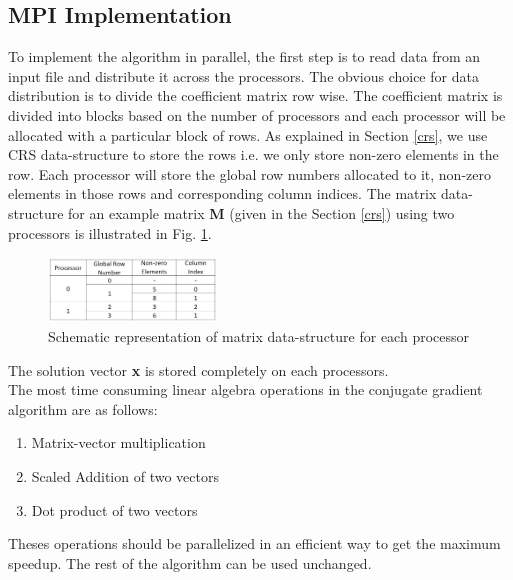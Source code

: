\documentclass[sigplan,screen]{acmart}
\begin{document}
\subsection{MPI Implementation}
To implement the algorithm in parallel, the first step is to read data from an input file and distribute it across the processors. The obvious choice for data distribution is to divide the  coefficient matrix row wise. The coefficient matrix is divided into blocks based on the number of processors and each processor will be allocated with a particular block of rows. As explained in Section \ref{crs}, we use CRS data-structure to store the rows i.e. we only store non-zero elements in the row. Each processor will store the global row numbers allocated to it, non-zero elements in those rows and corresponding column indices. The matrix data-structure for an example matrix \textbf{M} (given in the Section \ref{crs}) using two processors is illustrated in Fig. \ref{fig1}.
\begin{figure}[h!]
	\begin{center}
		\includegraphics[width=0.4\textwidth]{data.JPG}
	\end{center}
	\caption{Schematic representation of matrix data-structure for each processor}
	\label{fig1} 
\end{figure}
The solution vector \textbf{x} is stored completely on each processors.\\
The most time consuming linear algebra operations in the conjugate gradient algorithm are as follows:
\begin{enumerate}
	\item Matrix-vector multiplication
	\item Scaled Addition of two vectors
	\item Dot product of two vectors	
\end{enumerate}
Theses operations should be parallelized in an efficient way to get the maximum speedup.  The rest of the algorithm can be used unchanged.  
\end{document}
